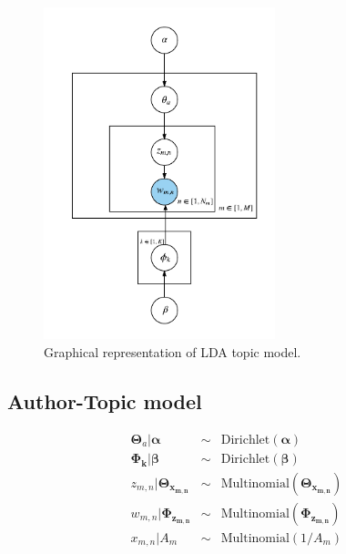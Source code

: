 \begin{figure}[h]
\centering
\includegraphics[width=0.6\textwidth]{figures/LDA.png}
\caption{Graphical representation of LDA topic model.}
\label{fig:atot}
\end{figure}

\subsection{Author-Topic model} \label{Author-Topic model}

 
\begin{eqnarray*} \label{eq:at}
\boldsymbol{\Theta}_a | \boldsymbol{\alpha} & \sim & \text{Dirichlet}(\boldsymbol{\alpha})\\
\boldsymbol{\Phi_{k}} | \boldsymbol{\beta} & \sim & \text{Dirichlet}(\boldsymbol{\beta})\\
z_{m,n} | \boldsymbol{\Theta_{x_{m,n}}} & \sim & \text{Multinomial}(\boldsymbol{\Theta_{x_{m,n}}})\\
w_{m,n} | \boldsymbol{\Phi_{z_{m,n}}} & \sim & \text{Multinomial}(\boldsymbol{\Phi_{z_{m,n}}})\\
x_{m,n} | A_m & \sim & \text{Multinomial}(1/A_m)\\

\end{eqnarray*}


